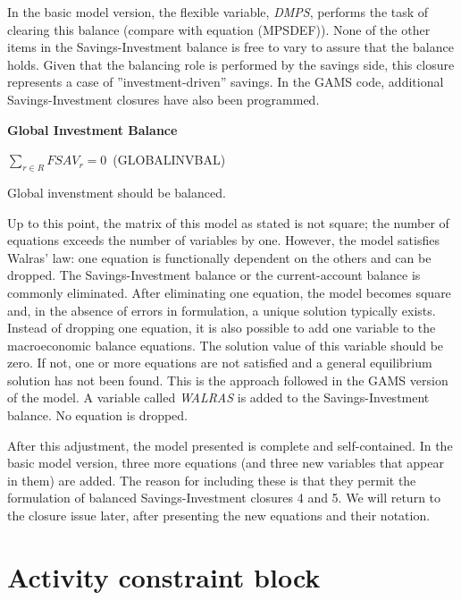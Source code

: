 \documentclass[10pt,a4paper,titlepage,dvipdfmx]{book}
\begin{document}
In the basic model version, the flexible variable, \textit{DMPS}, performs the task of clearing this balance (compare with equation (MPSDEF)). None of the other items in the Savings-Investment balance is free to vary to assure that the balance holds. Given that the balancing role is performed by the savings side, this closure represents a case of ''investment-driven'' savings. In the GAMS code, additional Savings-Investment closures have also been programmed. 

\begin{flushleft}\textbf{Global Investment Balance}\end{flushleft}


\begin{center}$\sum _{r\in R}FSAV_{r}=0\,$ (GLOBALINVBAL)
\end{center}

Global invenstment should be balanced.

Up to this point, the matrix of this model as stated is not square; the number of equations exceeds the number of variables by one. However, the model satisfies Walras' law: one equation is functionally dependent on the others and can be dropped. The Savings-Investment balance or the current-account balance is commonly eliminated. After eliminating one equation, the model becomes square and, in the absence of errors in formulation, a unique solution typically exists. Instead of dropping one equation, it is also possible to add one variable to the macroeconomic balance equations. The solution value of this variable should be zero. If not, one or more equations are not satisfied and a general equilibrium solution has not been found. This is the approach followed in the GAMS version of the model. A variable called \textit{WALRAS} is added to the Savings-Investment balance. No equation is dropped. 

After this adjustment, the model presented is complete and self-contained. In the basic model version, three more equations (and three new variables that appear in them) are added. The reason for including these is that they permit the formulation of balanced Savings-Investment closures 4 and 5. We will return to the closure issue later, after presenting the new equations and their notation.

\section{\label{sec:ActConBlo}Activity constraint block}
\end{document}
